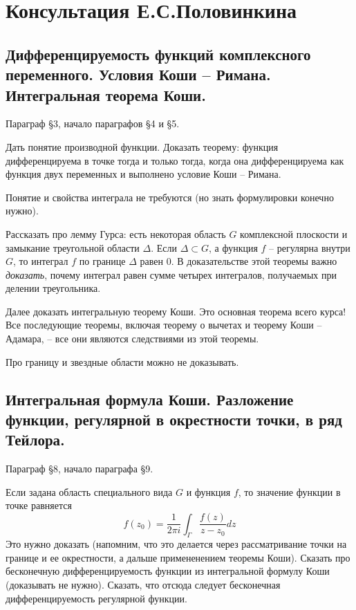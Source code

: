 \newpage
\section{Консультация Е.С.Половинкина}

\subsection{Дифференцируемость функций комплексного переменного. Условия Коши -- Римана. Интегральная теорема Коши.}

Параграф \S3, начало параграфов \S4 и \S5. 

Дать понятие производной функции. Доказать теорему: функция дифференцируема в точке тогда и только тогда, когда она дифференцируема как функция двух переменных и выполнено условие Коши -- Римана.

Понятие и свойства интеграла не требуются (но знать формулировки конечно нужно). 

Рассказать про лемму Гурса: есть некоторая область $G$ комплексной плоскости и замыкание треугольной области $\Delta$. Если $\Delta \subset G$, а функция $f$ -- регулярна внутри $G$, то интеграл $f$ по границе $\Delta$ равен 0. В доказательстве этой теоремы важно \textit{доказать}, почему интеграл равен сумме четырех интегралов, получаемых при делении треугольника.

Далее доказать интегральную теорему Коши. Это основная теорема всего курса! Все последующие теоремы, включая теорему о вычетах и теорему Коши -- Адамара, -- все они являются следствиями из этой теоремы.

Про границу и звездные области можно не доказывать.

\subsection{Интегральная формула Коши. Разложение функции, регулярной в окрестности точки, в ряд Тейлора.}

Параграф \S8, начало параграфа \S9.      

Если задана область специального вида $G$ и функция $f$, то значение функции в точке равняется 
\begin{equation*}
    f(z_0) = \frac{1}{2\pi i}\int_{\Gamma} \frac{f(z)}{z - z_0}dz
\end{equation*}
Это нужно доказать (напомним, что это делается через рассматривание точки на границе и ее окрестности, а дальше примененением теоремы Коши).  
Сказать про бесконечную дифференцируемость функции из интегральной формулу Коши (доказывать не нужно). Сказать, что отсюда следует бесконечная дифференцируемость регулярной функции.

